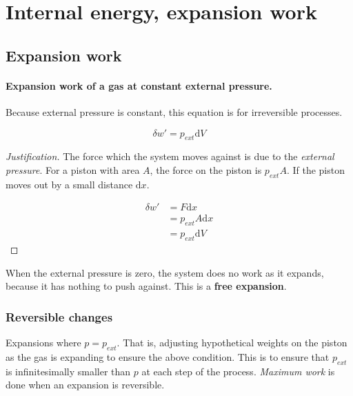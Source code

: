 \documentclass{article}
\numberwithin{theorem}{section}
\numberwithin{corollary}{section}
\numberwithin{postulate}{section}
\numberwithin{lemma}{section}
\numberwithin{definition}{section}
\newenvironment{justification} {\begin{proof}[Justification]} {\end{proof}}
\begin{document}
\section{Internal energy, expansion work}

\subsection{Expansion work} 

\paragraph{Expansion work of a gas at constant external pressure.} Because
external pressure is constant, this equation is for irreversible processes.

\begin{equation}
  \delta w' = p_{ext} \mathrm{d}V
\end{equation}

\begin{justification}
  The force which the system moves against is due to the \textit{external
  pressure}. For a piston with area $A$, the force on the piston is $p_{ext}A$. If the
  piston moves out by a small distance $\mathrm{d}x$.

  \begin{equation*}
  \begin{split}
    \delta w' & = F\mathrm{d}x \\
    & =  p_{ext} A \mathrm{d}x \\
    & = p_{ext} \mathrm{d}V
  \end{split}
\end{equation*}

\end{justification}

When the external pressure is zero, the system does no work as it expands,
because it has nothing to push against. This is a \textbf{free expansion}.

\subsubsection{Reversible changes}


Expansions where $p = p_{ext}$. That is, adjusting hypothetical weights on the
piston as the gas is expanding to ensure the above condition. This is to ensure
that $p_{ext}$ is infinitesimally smaller than $p$ at each step of the process.
\textit{Maximum work} is done when an expansion is reversible.
\end{document}
